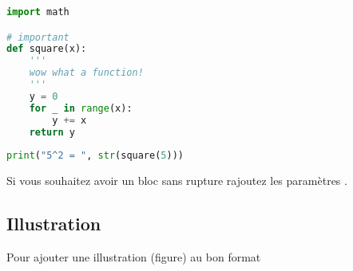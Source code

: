 \begin{lstlisting}[language=python, title={Exemple de bloc de code}]
import math

# important
def square(x):
	'''
	wow what a function!
	'''
	y = 0
	for _ in range(x):
		y += x
	return y
	
print("5^2 = ", str(square(5)))
\end{lstlisting}

Si vous souhaitez avoir un bloc sans rupture rajoutez les paramètres
.

\subsection{Illustration}

Pour ajouter une illustration (figure) au bon format

